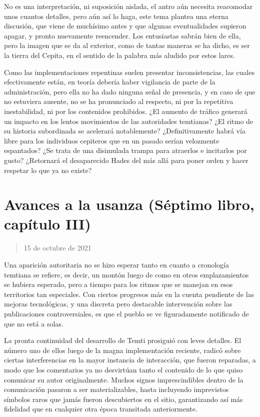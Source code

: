 \documentclass[
]{book}
\begin{document}
No es una interpretación, ni suposición aislada, el antro aún necesita reacomodar unos cuantos detalles, pero aún así lo haga, este tema plantea una eterna discusión, que viene de muchísimo antes y que algunas eventualidades supieron apagar, y pronto nuevamente reencender. Los entusiastas sabrán bien de ella, pero la imagen que se da al exterior, como de tantas maneras se ha dicho, es ser la tierra del Cepita, en el sentido de la palabra más aludido por estos lares.

Como las implementaciones repentinas suelen presentar inconsistencias, las cuales efectivamente están, en teoría debería haber vigilancia de parte de la administración, pero ella no ha dado ninguna señal de presencia, y en caso de que no estuviera ausente, no se ha pronunciado al respecto, ni por la repetitiva inestabilidad, ni por los contenidos prohibidos. ¿El aumento de tráfico generará un impacto en los lentos movimientos de las autoridades temtianas? ¿El ritmo de su historia subordinada se acelerará notablemente? ¿Definitivamente habrá vía libre para los individuos cepiteros que en un pasado serían velozmente espantados? ¿Se trata de una disimulada trampa para atraerlos e incitarlos por gusto? ¿Retornará el desaparecido Hades del más allá para poner orden y hacer respetar lo que ya no existe?

\hypertarget{avances-a-la-usanza-suxe9ptimo-libro-capuxedtulo-iii}{%
\section{Avances a la usanza (Séptimo libro, capítulo III)}\label{avances-a-la-usanza-suxe9ptimo-libro-capuxedtulo-iii}}

\begin{quote}
15 de octubre de 2021
\end{quote}

Una aparición autoritaria no se hizo esperar tanto en cuanto a cronología temtiana se refiere, es decir, un montón luego de como en otros emplazamientos se hubiera esperado, pero a tiempo para los ritmos que se manejan en esos territorios tan especiales. Con ciertos progresos más en la cuenta pendiente de las mejoras tecnológicas, y una discreta pero destacable intervención sobre las publicaciones controversiales, es que el pueblo se ve figuradamente notificado de que no está a solas.

La pronta continuidad del desarrollo de Temti prosiguió con leves detalles. El número uno de ellos luego de la magna implementación reciente, radicó sobre ciertas interferencias en la mayor instancia de interacción, que fueron reparadas, a modo que los comentarios ya no desvirtúan tanto el contenido de lo que quiso comunicar su autor originalmente. Muchos signos imprescindibles dentro de la comunicación pasaron a ser materializables, hasta incluyendo imprevistos símbolos raros que jamás fueron descubiertos en el sitio, garantizando así más fidelidad que en cualquier otra época transitada anteriormente.
\end{document}
